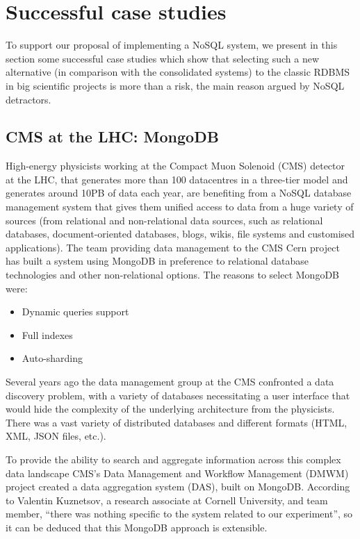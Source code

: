 \chapter{Successful case studies}

To support our proposal of implementing a NoSQL system, we present in this section some successful case studies which show that selecting such a new alternative (in comparison with the consolidated systems) to the classic RDBMS in big scientific projects is more than a risk, the main reason argued by NoSQL detractors.


\section{CMS at the LHC: MongoDB}

High-energy physicists working at the Compact Muon Solenoid (CMS) detector at the LHC, that generates more than 100 datacentres in a three-tier model and generates around 10PB of data each year, are benefiting from a NoSQL database management system that gives them unified access to data from a huge variety of sources (from relational and non-relational data sources, such as relational databases, document-oriented databases, blogs, wikis, file systems and customised applications). The team providing data management to the CMS Cern project has built a system using MongoDB in preference to relational database technologies and other non-relational options. The reasons to select MongoDB were:

\begin{itemize}
\item Dynamic queries support
\item Full indexes
\item Auto-sharding
\end{itemize}

Several years ago the data management group at the CMS confronted a data discovery problem, with a variety of databases necessitating a user interface that would hide the complexity of the underlying architecture from the physicists. There was a vast variety of distributed databases and different formats (HTML, XML, JSON files, etc.).

To provide the ability to search and aggregate information across this complex data landscape CMS's Data Management and Workflow Management (DMWM) project created a data aggregation system (DAS), built on MongoDB.  According to Valentin Kuznetsov, a research associate at Cornell University, and team member, ``there was nothing specific to the system related to our experiment'', so it can be deduced that this MongoDB approach is extensible. 




